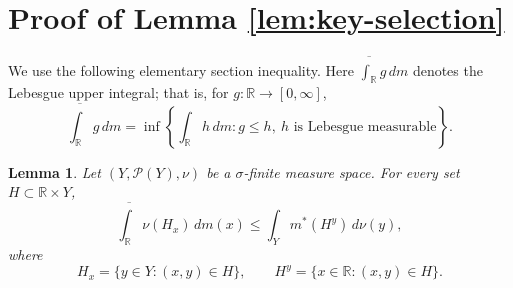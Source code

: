 \documentclass{amsart}
\theoremstyle{plain}
\newtheorem{lemma}[theorem]{Lemma}
\theoremstyle{definition}
\newcommand{\R}{\mathbb{R}}
\newcommand{\Pc}{\mathcal{P}}
\begin{document}
\section{Proof of Lemma \ref{lem:key-selection}}\label{sec:key-selection}

We use the following elementary section inequality.
Here $\overline{\int_\R} g\,dm$ denotes the Lebesgue upper integral; that is, for $g:\R\to[0,\infty]$,
\begin{equation}\label{eq:upper-integral-definition}
\overline{\int_\R} g\,dm
=
\inf\left\{\int_\R h\,dm:g\le h,\ h\text{ is Lebesgue measurable}\right\}.
\end{equation}

\begin{lemma}\label{lem:direct-section-inequality}
Let $(Y,\Pc(Y),\nu)$ be a $\sigma$-finite measure space.
For every set $H\subset\R\times Y$,
\begin{equation}\label{eq:direct-section-inequality}
\overline{\int_\R}\nu(H_x)\,dm(x)
\le
\int_Y m^*(H^y)\,d\nu(y),
\end{equation}
where
\begin{equation}\label{eq:section-notation}
H_x=\{y\in Y:(x,y)\in H\},
\qquad
H^y=\{x\in\R:(x,y)\in H\}.
\end{equation}
\end{lemma}
\end{document}
